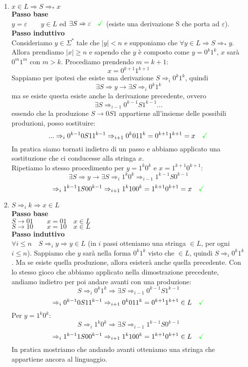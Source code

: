 \documentclass[a4paper,oneside]{scrbook}
\newcommand{\greenmark}{\quad \textcolor{green}{\checkmark}}
\begin{document}
\begin{enumerate}
	\item $x\in L \Rightarrow S \Rightarrow_* x $\\
	\textbf{Passo base}\\
	$y=\varepsilon \qquad y \in L$ ed $\exists S\Rightarrow \varepsilon \greenmark $ (esiste una derivazione S che porta ad $\varepsilon$).\\
	\textbf{Passo induttivo}\\
	Consideriamo $y \in \Sigma^*$ tale che $|y|<n$ e supponiamo che $\forall y \in L \Rightarrow S \Rightarrow_* y$.\\
	Allora prendiamo $|x|\geq n$ e sapendo che $y$ è composto come $y=0^k1^k$, $x$ sarà $0^m1^m$ con $m>k$. Procediamo prendendo $m=k+1$:
	$$ x=0^{k+1}1^{k+1}$$
	Sappiamo per ipotesi che esiste una derivazione  $S\Rightarrow_i 0^k1^k$, quindi
	$$\exists S \Rightarrow y \rightarrow \exists S \Rightarrow_i 0^k1^k$$
	ma se esiste questa esiste anche la derivazione precedente, ovvero
	$$\exists S \Rightarrow_{i-1} 0^{k-1}S1^{k-1} ...$$
	essendo che la produzione $S\rightarrow 0S1$ appartiene all'insieme delle possibili produzioni, posso sostituire:
	$$... \Rightarrow_i 0^{k-1}0S11^{k-1} \Rightarrow_{i+1} 0^k011^k = 0^{k+1}1^{k+1} = x \greenmark$$
	In pratica siamo tornati indietro di un passo e abbiamo applicato una sostituzione che ci conducesse alla stringa $x$.\\
	Ripetiamo lo stesso procedimento per $y=1^k0^k$ e $x=1^{k+1}0^{k+1}$:
	$$\exists S \Rightarrow y \rightarrow \exists S \Rightarrow_i 1^k0^k \Rightarrow_{i-1} 1^{k-1}S0^{k-1}$$
	$$\Rightarrow_i 1^{k-1}1S00^{k-1} \Rightarrow_{i+1} 1^k100^k = 1^{k+1}0^{k+1} = x \greenmark$$
	
	\item $ S \Rightarrow_i k \Rightarrow x \in L$\\
	\textbf{Passo base}\\
	$S\rightarrow 01 \qquad x=01 \quad x \in L$\\
	$S\rightarrow 10 \qquad x=10 \quad x \in L$\\
	\textbf{Passo induttivo}\\
	$\forall i \leq n \quad S \Rightarrow_i y \Rightarrow y \in L $ (in $i$ passi otteniamo una stringa $\in L$, per ogni $i\leq n$).
	Sappiamo che $y$ sarà nella forma $0^k1^k$ visto che $\in L$, quindi $S \Rightarrow_i 0^k1^k$. Ma se esiste quella produzione, allora
	esisterà anche quella precedente. Con lo stesso gioco che abbiamo applicato nella dimostrazione precedente, andiamo indietro per poi
	andare avanti con una produzione:
	$$S \Rightarrow_i 0^k1^k \Rightarrow \exists S \Rightarrow_{i-1} 0^{k-1}S1^{k-1}$$
	$$\Rightarrow_i 0^{k-1}0S11^{k-1} \Rightarrow_{i+1} 0^k011^k = 0^{k+1}1^{k+1} \in L \greenmark$$
	Per $y=1^k0^k$:
	$$S \Rightarrow_i 1^k0^k \Rightarrow \exists S \Rightarrow_{i-1} 1^{k-1}S0^{k-1}$$
	$$\Rightarrow_i 1^{k-1}1S00^{k-1} \Rightarrow_{i+1} 1^k100^k = 1^{k+1}0^{k+1} \in L \greenmark$$
	In pratica mostriamo che andando avanti otteniamo una stringa che appartiene ancora al linguaggio.
\end{enumerate}
\end{document}
